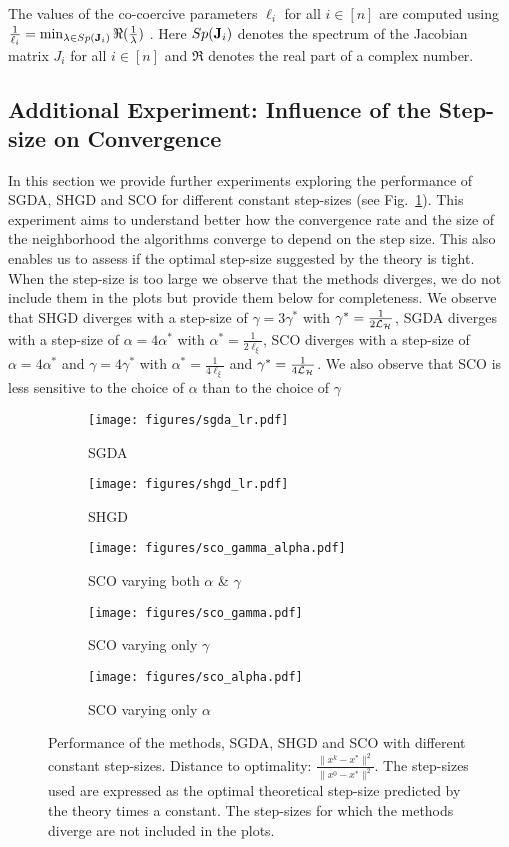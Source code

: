 \documentclass{article}
\begin{document}
The values of the co-coercive parameters $\ell_i$ for all $i \in [n]$ are computed using $\frac{1}{\ell_i} = \min_{\lambda \in Sp(\mathbf{J}_i)} \Re(\frac{1}{\lambda})$ \citep{azizian2019tight}. Here $Sp(\mathbf{J}_i)$ denotes the spectrum of the Jacobian matrix $J_i$ for all $i \in [n]$ and $\Re$ denotes the real part of a complex number.

\subsection{Additional Experiment: Influence of the Step-size on Convergence}
\label{app:step_size_study}
In this section we provide further experiments exploring the performance of SGDA, SHGD and SCO for different constant step-sizes (see Fig.~\ref{fig:lr_grid}). This experiment aims to understand better how the convergence rate and the size of the neighborhood the algorithms converge to depend on the step size. This also enables us to assess if the optimal step-size suggested by the theory is tight.
When the step-size is too large we observe that the methods diverges, we do not include them in the plots but provide them below for completeness. We observe that SHGD diverges with a step-size of $\gamma=3\gamma^*$ with $\gamma^*=\frac{1}{2{\cal L}_{{\cal H}}}$, SGDA diverges with a step-size of $\alpha=4\alpha^*$ with $\alpha^*=\frac{1}{2\ell_\xi}$, SCO diverges with a step-size of $\alpha=4\alpha^*$ and $\gamma=4\gamma^*$ with $\alpha^*=\frac{1}{4\ell_\xi}$ and $\gamma^*=\frac{1}{4{\cal L}_{{\cal H}}}$.
We also observe that SCO is less sensitive to the choice of $\alpha$ than to the choice of $\gamma$

\begin{figure}[H]
  \centering
  \begin{subfigure}[b]{0.32\textwidth}
    \texttt{[image: figures/sgda\_lr.pdf]}
    \caption{SGDA}
  \end{subfigure}
  \begin{subfigure}[b]{0.32\textwidth}
    \texttt{[image: figures/shgd\_lr.pdf]}
    \caption{SHGD}
  \end{subfigure}
  \begin{subfigure}[b]{0.32\textwidth}
    \texttt{[image: figures/sco\_gamma\_alpha.pdf]}
    \caption{SCO varying both $\alpha$ \& $\gamma$}
  \end{subfigure}
  \begin{subfigure}[b]{0.32\textwidth}
    \texttt{[image: figures/sco\_gamma.pdf]}
    \caption{SCO varying only $\gamma$}
  \end{subfigure}
  \begin{subfigure}[b]{0.32\textwidth}
    \texttt{[image: figures/sco\_alpha.pdf]}
    \caption{SCO varying only $\alpha$}
  \end{subfigure}
  \caption{Performance of the methods, SGDA, SHGD and SCO with different constant step-sizes. Distance to optimality: $\frac{\|x^k-x^*\|^2}{\|x^0-x^*\|^2}$. The step-sizes used are expressed as the optimal theoretical step-size predicted by the theory times a constant. The step-sizes for which the methods diverge are not included in the plots.}
  \label{fig:lr_grid}
\end{figure}
\newpage
\end{document}
